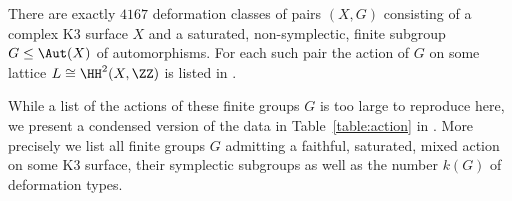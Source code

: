 \begin{theorem}\label{mainthm}
There are exactly $4167$ deformation classes of pairs $(X,G)$ consisting of a complex K3 surface $X$ and a saturated, non-symplectic, finite subgroup $G \leq \Aut(X)$ of automorphisms.
For each such pair the action of $G$ on some lattice $L \cong \HH^2(X,\ZZ)$ is listed in \cite{K3Groups}.
\end{theorem}

While a list of the actions of these finite groups $G$ is too large to reproduce here,
we present a condensed
version of the data in Table~\ref{table:action} in .
More precisely we list all finite groups $G$ admitting a faithful, saturated, mixed action on some K3 surface, their symplectic subgroups as well as the number $k(G)$ of deformation types.

